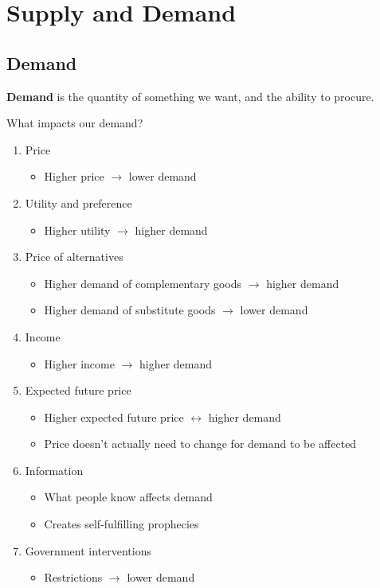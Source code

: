\chapter{Supply and Demand}

\section{Demand}

\begin{definition}
  \textbf{Demand} is the quantity of something we want, and the ability to procure.
\end{definition}

What impacts our demand?
\begin{enumerate}
  \item Price\begin{itemize}
    \item Higher price $\rightarrow$ lower demand
  \end{itemize}
  \item Utility and preference\begin{itemize}
    \item Higher utility $\rightarrow$ higher demand
  \end{itemize}
  \item Price of alternatives\begin{itemize}
    \item Higher demand of complementary goods $\rightarrow$ higher demand
    \item Higher demand of substitute goods $\rightarrow$ lower demand
  \end{itemize}
  \item Income\begin{itemize}
    \item Higher income $\rightarrow$ higher demand
  \end{itemize}
  \item Expected future price\begin{itemize}
    \item Higher expected future price $\leftrightarrow$ higher demand
    \item Price doesn't actually need to change for demand to be affected
  \end{itemize}
  \item Information\begin{itemize}
    \item What people know affects demand
    \item Creates self-fulfilling prophecies
  \end{itemize}
  \item Government interventions\begin{itemize}
    \item Restrictions $\rightarrow$ lower demand
  \end{itemize}
\end{enumerate}

